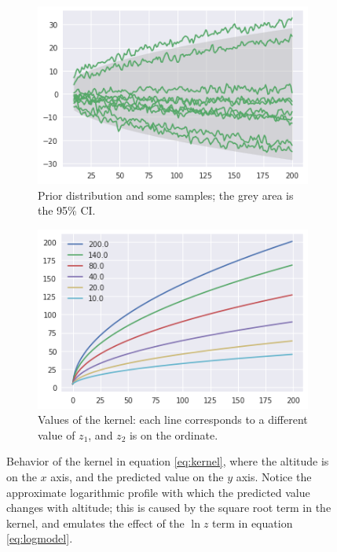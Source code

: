 \documentclass[a4paper]{book}
\begin{document}
\begin{figure}
    \centering
    \begin{subfigure}[t]{0.45\textwidth}
        \centering
        \includegraphics[width=\textwidth]{images/profile_kernel_prior}
        \caption{Prior distribution and some samples; the grey area is the 95\% CI.}
        \label{fig:kernel_prior}
    \end{subfigure}
    \hfill
    \begin{subfigure}[t]{0.45\textwidth}
        \centering
        \includegraphics[width=\textwidth]{images/kernel_values}
        \caption{Values of the kernel: each line corresponds to a different value of $z_1$, and $z_2$ is on the ordinate.}
        \label{fig:kernel_values}
    \end{subfigure}
    \caption{Behavior of the kernel in equation \ref{eq:kernel}, where the altitude is on the $x$ axis, and the predicted value on the $y$ axis. Notice the approximate logarithmic profile with which the predicted value changes with altitude; this is caused by the square root term in the kernel, and emulates the effect of the $\ln z$ term in equation \ref{eq:logmodel}.}
	\label{fig:kernel}
\end{figure}
\end{document}
